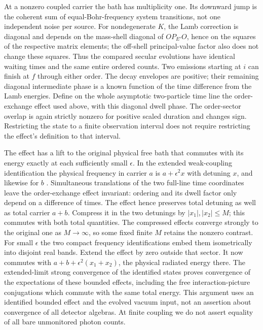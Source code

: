 \documentclass[11pt]{article}
\begin{document}
At a nonzero coupled carrier the bath has multiplicity one. Its downward jump is the coherent sum of equal-Bohr-frequency system transitions, not one independent noise per source. For nondegenerate \(K\), the Lamb correction is diagonal and depends on the mass-shell diagonal of \(OP_{E'}O\), hence on the squares of the respective matrix elements; the off-shell principal-value factor also does not change these squares. Thus the compared secular evolutions have identical waiting times and the same entire ordered counts. Two emissions starting at \(i\) can finish at \(f\) through either order. The decay envelopes are positive; their remaining diagonal intermediate phase is a known function of the time difference from the Lamb energies. Define on the whole asymptotic two-particle time line the order-exchange effect used above, with this diagonal dwell phase. The order-sector overlap is again strictly nonzero for positive scaled duration and changes sign. Restricting the state to a finite observation interval does not require restricting the effect's definition to that interval.

The effect has a lift to the original physical free bath that commutes with its energy exactly at each sufficiently small \(\epsilon\). In the extended weak-coupling identification the physical frequency in carrier \(a\) is \(a+\epsilon^2x\) with detuning \(x\), and likewise for \(b\) \cite[Eq.~(4.14)]{dere}. Simultaneous translations of the two full-line time coordinates leave the order-exchange effect invariant: ordering and its dwell factor only depend on a difference of times. The effect hence preserves total detuning as well as total carrier \(a+b\). Compress it in the two detunings by \(|x_1|,|x_2|\le M\); this commutes with both total quantities. The compressed effects converge strongly to the original one as \(M\to\infty\), so some fixed finite \(M\) retains the nonzero contrast. For small \(\epsilon\) the two compact frequency identifications embed them isometrically into disjoint real bands. Extend the effect by zero outside that sector. It now commutes with \(a+b+\epsilon^2(x_1+x_2)\), the physical radiated energy there. The extended-limit strong convergence of the identified states proves convergence of the expectations of these bounded effects, including the free interaction-picture conjugations which commute with the same total energy. This argument uses an identified bounded effect and the evolved vacuum input, not an assertion about convergence of all detector algebras. At finite coupling we do not assert equality of all bare unmonitored photon counts.
\end{document}
